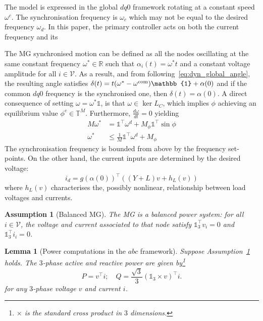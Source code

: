 \documentclass[journal, final, letterpaper]{IEEEtran}
\newtheorem{lemma}[theorem]{Lemma}
\newtheorem{assumption}{Assumption}
\newcommand{\ts}[1]{{\textnormal{#1}}}
\newcommand{\diff}[2]{{\frac{d #1}{d #2}}}
\newcommand{\Rset}{\mathbb{R}}
\newcommand{\mc}{\mathcal}
\newcommand{\mbb}{\mathbb}
\begin{document}
The model is expressed in the global $dq0$ framework rotating at a constant speed $\omega^c$. The synchronisation frequency is $\omega_c$ which may not be equal to the desired frequency $\omega_d$. In this paper, the primary controller acts on both the current frequency and its 


The \ac{MG} synchronised motion can be defined as all the nodes oscillating at the same constant frequency $\omega^*\in\Rset$ such that $\alpha_i(t) =\omega^*t$ and a constant voltage amplitude for all $i\in\mc{V}$. As a result, and from following~\eqref{eq:dyn_global_angle}, the resulting angle satisfies $\delta(t) = t(\omega^* - \omega^\ts{com})\mbb{1} + \alpha(0)$ and if the common $dq0$ frequency is the synchronised one, then $\delta(t) = \alpha(0)$. A direct consequence of setting $\omega = \omega^*\mbb{1}$, is that $\omega\in\ker{L_C}$, which implies $\phi$ achieving an equilibrium value $\phi^{e}\in\mbb{T}^{M}$. Furthermore, $\diff{\omega}{t} = 0$ yielding
%
\begin{align*}
	M\omega^* &= \mbb{1}^\top\omega^{d} + M_\phi\mbb{1}^\top\sin\phi\\
	\omega^* & \leq  \frac{1}{M} \mbb{1}^\top\omega^{d} + M_\phi
\end{align*}
%
The synchronisation frequency is bounded from above by the frequency set-points. On the other hand, the current inputs are determined by the desired voltage:
%
\[
i_{d} = g(\alpha(0))^\top((Y+L ) v + h_L(v))
\]
where $h_L(v)$ characterises the, possibly nonlinear, relationship between load voltages and currents. 


\begin{assumption}[Balanced \ac{MG}]
The \ac{MG} is a balanced power system: for all $i\in\mc{V}$, the voltage and current associated to that node satisfy $\mbb{1}_3^\top v_i = 0$ and $\mbb{1}_3^\top i_i = 0$.
\label{asssump:MG_balanced}
\end{assumption}

\begin{lemma}[Power computations in the $abc$ framework]
	Suppose Assumption~\ref{asssump:MG_balanced} holds. The $3$-phase active and reactive power are given by\footnote{$\times$ is the standard cross product in $3$ dimensions.}
	\begin{equation}
		P = v^\top i;\quad Q = \frac{\sqrt{3}}{3}(\mbb{1}_3\times v)^\top i.
	\end{equation}
	for any $3$-phase voltage $v$ and current $i$. 
\label{lem:power_computation}
\end{lemma}
\end{document}
